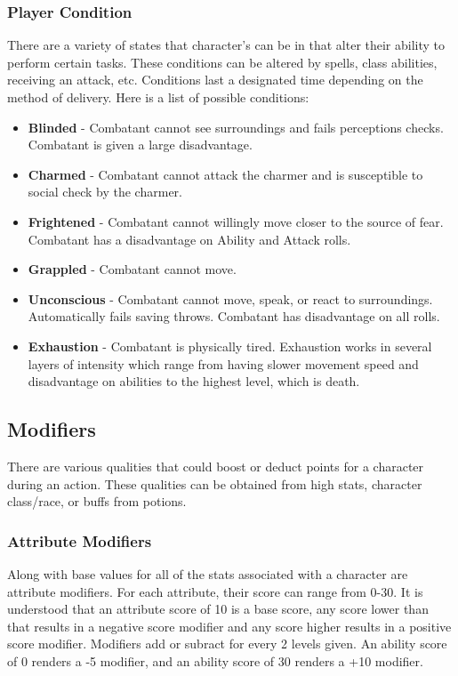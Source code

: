 \documentclass[12pt,a4paper]{report}
\begin{document}
		\subsubsection{Player Condition}
			There are a variety of states that character's can be in that alter their ability to perform certain tasks. These conditions can be altered by spells, class abilities, receiving an attack, etc. Conditions last a designated time depending on the method of delivery. Here is a list of possible conditions:
		\begin{itemize}
			\item \textbf{Blinded} - Combatant cannot see surroundings and fails perceptions checks. Combatant is given a large disadvantage.
			\item \textbf{Charmed} - Combatant cannot attack the charmer and is susceptible to social check by the charmer.
			\item \textbf{Frightened} - Combatant cannot willingly move closer to the source of fear. Combatant has a disadvantage on Ability and Attack rolls.
			\item \textbf{Grappled} - Combatant cannot move.
			\item \textbf{Unconscious} - Combatant cannot move, speak, or react to surroundings. Automatically fails saving throws. Combatant has disadvantage on all rolls.
			\item \textbf{Exhaustion} - Combatant is physically tired. Exhaustion works in several layers of intensity which range from having slower movement speed and disadvantage on abilities to the highest level, which is death.
		\end{itemize}
		\subsection{Modifiers}
			There are various qualities that could boost or deduct points for a character during an action. These qualities can be obtained from high stats, character class/race, or buffs from potions.
		\subsubsection{Attribute Modifiers}
			Along with base values for all of the stats associated with a character are attribute modifiers. For each attribute, their score can range from 0-30. It is understood that an attribute score of 10 is a base score, any score lower than that results in a negative score modifier and any score higher results in a positive score modifier. Modifiers add or subract for every 2 levels given. An ability score of 0 renders a -5 modifier, and an ability score of 30 renders a +10 modifier.
\end{document}
